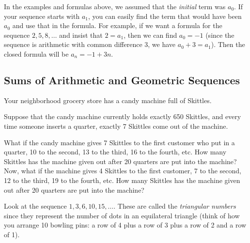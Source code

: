 \documentclass[12pt]{article}
\begin{document}
In the examples and formulas above, we assumed that the \emph{initial} term was $a_0$.  If your sequence starts with $a_1$, you can easily find the term that would have been $a_0$ and use that in the formula.  For example, if we want a formula for the sequence $2, 5, 8,\ldots$ and insist that $2= a_1$, then we can find $a_0 = -1$ (since the sequence is arithmetic with common difference 3, we have $a_0 + 3 = a_1$).  Then the closed formula will be $a_n = -1 + 3n$.



\subsection{Sums of Arithmetic and Geometric Sequences}

\begin{activity}
Your neighborhood grocery store has a candy machine full of Skittles.
\begin{questions}
\question Suppose that the candy machine currently holds exactly 650 Skittles, and every time someone inserts a quarter, exactly 7 Skittles come out of the machine. 
\question What if the candy machine gives 7 Skittles to the first customer who put in a quarter, 10 to the second, 13 to the third, 16 to the fourth, etc. How many Skittles has the machine given out after 20 quarters are put into the machine?
\question Now, what if the machine gives 4 Skittles to the first customer, 7 to the second, 12 to the third, 19 to the fourth, etc. How many Skittles has the machine given out after 20 quarters are put into the machine?
\end{questions}
\end{activity}



Look at the sequence $1, 3, 6, 10, 15,\ldots$.  These are called the \emph{triangular numbers} since they represent the number of dots in an equilateral triangle (think of how you arrange 10 bowling pins: a row of 4 plus a row of 3 plus a row of 2 and a row of 1).  
\end{document}
